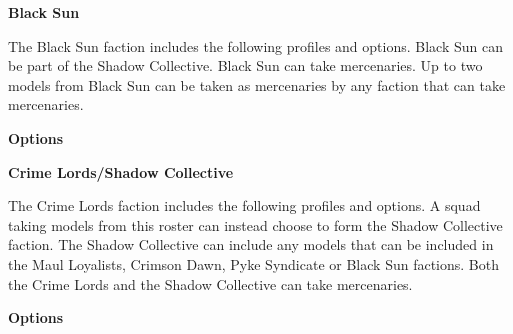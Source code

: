 \documentclass{article}
\begin{document}
\newpage

{\Large \textbf{Black Sun}}
\vspace{0.3cm}

\begin{minipage}{19cm}
    The Black Sun faction includes the following profiles and options.
    Black Sun can be part of the Shadow Collective.
    Black Sun can take mercenaries.
    Up to two models from Black Sun can be taken as mercenaries
    by any faction that can take mercenaries.
\end{minipage}

\vspace{0.3cm}
{\scriptsize
\setlength\extrarowheight{1.5pt}

}
\vspace{0.6cm}

{\large \textbf{Options}}
\vspace{0.3cm}
\begin{multicols}{2}
    {\scriptsize

    \setlength\extrarowheight{1.5pt}
    

    }
\end{multicols}

\vspace{0.6cm}

{\Large \textbf{Crime Lords/Shadow Collective}}
\vspace{0.3cm}

\begin{minipage}{19cm}
    The Crime Lords faction includes the following profiles and options.
    A squad taking models from this roster can instead choose to form the
    Shadow Collective faction. 
    The Shadow Collective can include any models that can be included 
    in the Maul Loyalists, Crimson Dawn, Pyke Syndicate or Black Sun factions.
    Both the Crime Lords and the Shadow Collective can take mercenaries.

\end{minipage}

\vspace{0.3cm}
{\scriptsize
\setlength\extrarowheight{1.5pt}

}
\vspace{0.6cm}

{\large \textbf{Options}}
\vspace{0.3cm}
\begin{multicols}{2}
    {\scriptsize

    \setlength\extrarowheight{1.5pt}
    

    }
\end{multicols}
\end{document}
